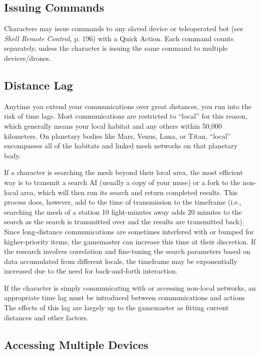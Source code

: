 \subsection{Issuing Commands}

Characters may issue commands to any slaved device 
or teleoperated bot (see \textit{Shell Remote Control,} p. 196) 
with a Quick Action. Each command counts separately, 
unless the character is issuing the same command to 
multiple devices/drones.

\subsection{Distance Lag}

Anytime you extend your communications over great 
distances, you run into the risk of time lags. Most 
communications are restricted to ``local'' for this 
reason, which generally means your local habitat 
and any others within 50,000 kilometers. On planetary
bodies like Mars, Venus, Luna, or Titan, ``local''
encompasses all of the habitats and linked mesh networks
on that planetary body.

If a character is searching the mesh beyond their 
local area, the most efficient way is to transmit a search 
AI (usually a copy of your muse) or a fork to the non-local
area, which will then run its search and return
completed results. This process does, however, add to 
the time of transmission to the timeframe (i.e., searching
the mesh of a station 10 light-minutes away adds
20 minutes to the search as the search is transmitted 
over and the results are transmitted back). Since long-distance
communications are sometimes interfered with
or bumped for higher-priority items, the gamemaster 
can increase this time at their discretion. If the research 
involves correlation and fine-tuning the search parameters
based on data accumulated from different locals,
the timeframe may be exponentially increased due to 
the need for back-and-forth interaction.

If the character is simply communicating with or 
accessing non-local networks, an appropriate time lag 
must be introduced between communications and actions
The effects of this lag are largely up to the gamemaster
as fitting current distances and other factors.

\subsection{Accessing Multiple Devices}

